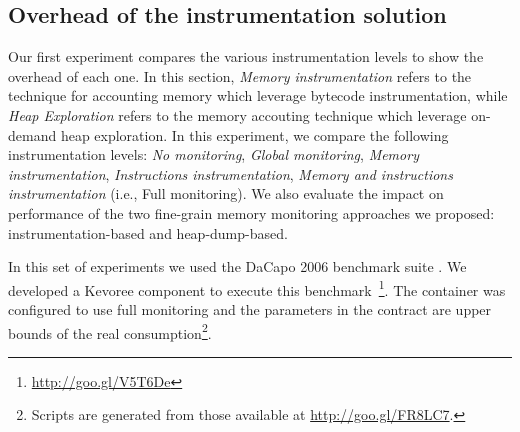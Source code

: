 \subsection{Overhead of the instrumentation solution\label{sec:OverheadFullMonitoring}}
Our first experiment compares the various instrumentation levels to show the overhead of each one. 
In this section, \emph{Memory instrumentation} refers to the technique for accounting memory which leverage bytecode instrumentation, while \textit{Heap Exploration} refers to the memory accouting technique which leverage on-demand heap exploration.
In this experiment, we compare the following instrumentation levels: \emph{No monitoring}, \emph{Global monitoring}, \emph{Memory instrumentation}, \emph{Instructions instrumentation}, \emph{Memory and instructions instrumentation} (i.e., Full monitoring).
We also evaluate the impact on performance of the two fine-grain memory monitoring approaches we proposed: instrumentation-based and heap-dump-based.

In this set of experiments we used the DaCapo 2006 benchmark suite \cite{DaCapo:paper}. 
We developed a Kevoree component to execute this benchmark~\footnote{\url{http://goo.gl/V5T6De}}.
The container was configured to use full monitoring and the parameters in the contract are upper bounds of the real consumption\footnote{Scripts are generated from those available at \url{http://goo.gl/FR8LC7}.}.

